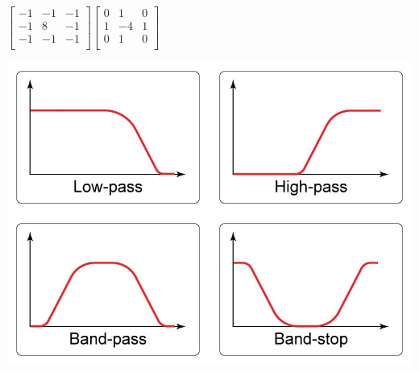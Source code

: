 \begin{minipage}{0.6\columnwidth}
$   
\begin{bmatrix}
        -1 & -1 & -1 \\
        -1 & 8 & -1 \\
        -1 & -1 & -1 \\
\end{bmatrix} 
$$
\begin{bmatrix}
        0 & 1 & 0 \\
        1 & -4 & 1 \\
        0 & 1 & 0 \\
\end{bmatrix} 
$
\end{minipage}
\begin{minipage}{0.4\columnwidth}
    \includegraphics[width = \linewidth]{assets/jo/Types_of_Filters.png}\\
\end{minipage}

